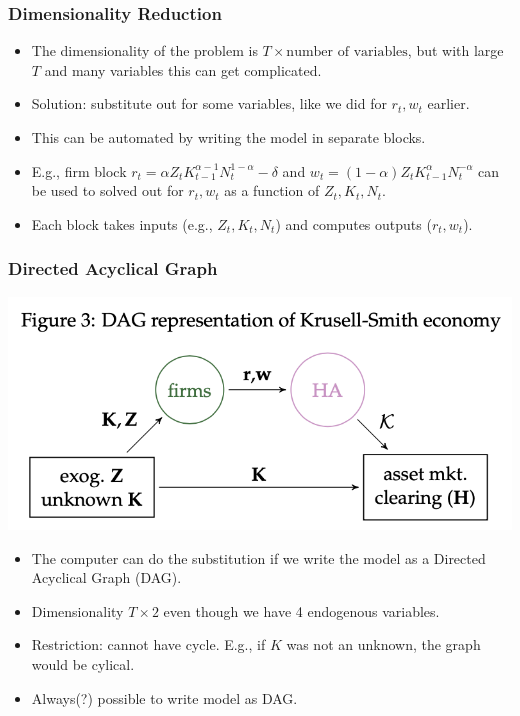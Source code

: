 \documentclass[english,xcolor=svgnames]{beamer}
\begin{document}
\begin{frame}
    \frametitle{Dimensionality Reduction}
    \begin{itemize}
    	\item The dimensionality of the problem is $T \times \text{number of variables}$, but with large $T$ and many variables this can get complicated.
    	\item Solution: substitute out for some variables, like we did for $r_t,w_t$ earlier. 
    	\item This can be automated by writing the model in separate blocks.
    	\item E.g., firm block $r_t = \alpha  Z_t K_{t-1}^{\alpha-1} N_t^{1-\alpha} - \delta $ and $ w_t = (1-\alpha) Z_t K_{t-1}^{\alpha} N_t^{-\alpha}$ can be used to solved out for $r_t,w_t$ as a function of $Z_t,K_t,N_t$.
    	\item Each block takes inputs (e.g., $Z_t,K_t,N_t$) and computes outputs ($r_t,w_t$).
	\end{itemize}
\end{frame}

\begin{frame}
    \frametitle{Directed Acyclical Graph}
    \begin{center}
    	\includegraphics[scale=0.5]{figures/ABRSFIG3.png}
    \end{center}
    \begin{itemize}
    	\item The computer can do the substitution if we write the model as a Directed Acyclical Graph (DAG).
    	\item Dimensionality $T \times 2$ even though we have 4 endogenous variables.
    	\item Restriction: cannot have cycle. E.g., if $K$ was not an unknown, the graph would be cylical.
        \item Always(?) possible to write model as DAG.
	\end{itemize}
\end{frame}
\end{document}
